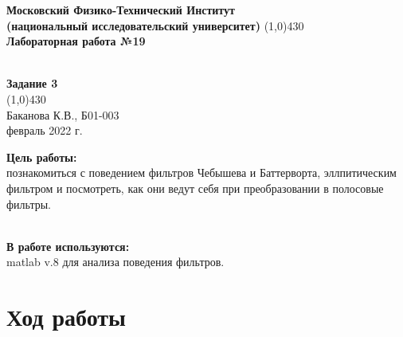 \documentclass[a4paper, 12pt]{article}%
\begin{document}
\begin{titlepage}

\begin{center}
\large\textbf{Московский Физико-Технический Институт}\\
\large\textbf{(национальный исследовательский университет)}
\vfill
\line(1,0){430}\\[3mm]
\huge\textbf{Лабораторная работа №19}\\
\item{   }\\
\large\textbf{Задание 3}\\
\line(1,0){430}\\[1mm]
\vfill
\large Баканова К.В., Б01-003\\
\large февраль 2022 г.\\
\end{center}

\end{titlepage}
\noindent \textbf{Цель работы:} \\
\indent познакомиться с поведением фильтров Чебышева и Баттерворта, эллпитическим фильтром и посмотреть, как они ведут себя при преобразовании в полосовые фильтры.\\
\item{   }\\ 
\noindent \textbf{В работе используются:} \\
\indent matlab v.8 для анализа поведения фильтров.

\section*{Ход работы}
\end{document}

